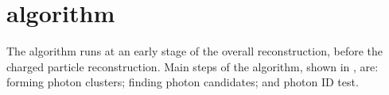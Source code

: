 



\section{\PhotonReconstruction algorithm}
\label{sec:photonRecostrcution}


The \PhotonReconstruction algorithm runs at an early stage of the overall reconstruction, before the charged particle reconstruction.   Main steps of the \PhotonReconstruction algorithm, shown in , are:  forming photon clusters; finding photon candidates; and photon ID test.



